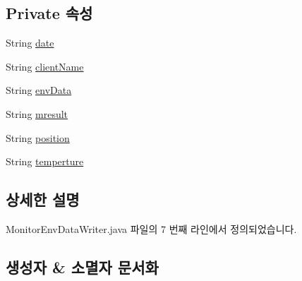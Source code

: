 \subsection*{Private 속성}
\begin{DoxyCompactItemize}
\item 
String \mbox{\hyperlink{classcom_1_1github_1_1aites_1_1shlocalaites_1_1gkconnect_1_1_monitor_env_data_writer_a04cac2bb3a2553675195bab75d11ecd4}{date}}
\item 
String \mbox{\hyperlink{classcom_1_1github_1_1aites_1_1shlocalaites_1_1gkconnect_1_1_monitor_env_data_writer_aace57a568b525d7bced3189c5ce11722}{client\+Name}}
\item 
String \mbox{\hyperlink{classcom_1_1github_1_1aites_1_1shlocalaites_1_1gkconnect_1_1_monitor_env_data_writer_a2f1b25081ef6c871c400583913e5a5a2}{env\+Data}}
\item 
String \mbox{\hyperlink{classcom_1_1github_1_1aites_1_1shlocalaites_1_1gkconnect_1_1_monitor_env_data_writer_a11c5cf2c8245d1768c10d733e6a9befa}{mresult}}
\item 
String \mbox{\hyperlink{classcom_1_1github_1_1aites_1_1shlocalaites_1_1gkconnect_1_1_monitor_env_data_writer_a087d637fddca614523c49e762de1e563}{position}}
\item 
String \mbox{\hyperlink{classcom_1_1github_1_1aites_1_1shlocalaites_1_1gkconnect_1_1_monitor_env_data_writer_a4360d90fa0ab7d3d76b2f4fd383f17da}{temperture}}
\end{DoxyCompactItemize}


\subsection{상세한 설명}


Monitor\+Env\+Data\+Writer.\+java 파일의 7 번째 라인에서 정의되었습니다.



\subsection{생성자 \& 소멸자 문서화}
\mbox{\label{classcom_1_1github_1_1aites_1_1shlocalaites_1_1gkconnect_1_1_monitor_env_data_writer_ab7d3d6af52342f720749695ec40aef43}} 
